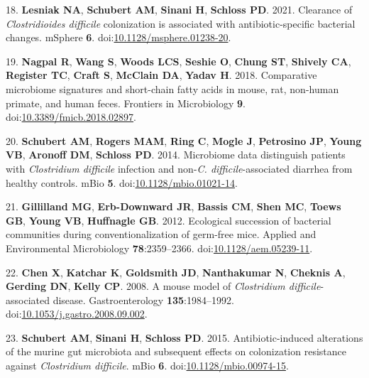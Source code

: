 \documentclass[
  12pt,
]{article}
\newenvironment{cslreferences}%
  {}%
  {\par}
\begin{document}
\begin{cslreferences}
\leavevmode\hypertarget{ref-Lesniak2021}{}%
18. \textbf{Lesniak NA}, \textbf{Schubert AM}, \textbf{Sinani H},
\textbf{Schloss PD}. 2021. Clearance of \emph{Clostridioides difficile}
colonization is associated with antibiotic-specific bacterial changes.
mSphere \textbf{6}.
doi:\href{https://doi.org/10.1128/msphere.01238-20}{10.1128/msphere.01238-20}.

\leavevmode\hypertarget{ref-Nagpal2018}{}%
19. \textbf{Nagpal R}, \textbf{Wang S}, \textbf{Woods LCS},
\textbf{Seshie O}, \textbf{Chung ST}, \textbf{Shively CA},
\textbf{Register TC}, \textbf{Craft S}, \textbf{McClain DA},
\textbf{Yadav H}. 2018. Comparative microbiome signatures and
short-chain fatty acids in mouse, rat, non-human primate, and human
feces. Frontiers in Microbiology \textbf{9}.
doi:\href{https://doi.org/10.3389/fmicb.2018.02897}{10.3389/fmicb.2018.02897}.

\leavevmode\hypertarget{ref-Schubert2014}{}%
20. \textbf{Schubert AM}, \textbf{Rogers MAM}, \textbf{Ring C},
\textbf{Mogle J}, \textbf{Petrosino JP}, \textbf{Young VB},
\textbf{Aronoff DM}, \textbf{Schloss PD}. 2014. Microbiome data
distinguish patients with \emph{Clostridium difficile} infection and
non-\emph{C. difficile}-associated diarrhea from healthy controls. mBio
\textbf{5}.
doi:\href{https://doi.org/10.1128/mbio.01021-14}{10.1128/mbio.01021-14}.

\leavevmode\hypertarget{ref-Gillilland2012}{}%
21. \textbf{Gillilland MG}, \textbf{Erb-Downward JR}, \textbf{Bassis
CM}, \textbf{Shen MC}, \textbf{Toews GB}, \textbf{Young VB},
\textbf{Huffnagle GB}. 2012. Ecological succession of bacterial
communities during conventionalization of germ-free mice. Applied and
Environmental Microbiology \textbf{78}:2359--2366.
doi:\href{https://doi.org/10.1128/aem.05239-11}{10.1128/aem.05239-11}.

\leavevmode\hypertarget{ref-Chen2008}{}%
22. \textbf{Chen X}, \textbf{Katchar K}, \textbf{Goldsmith JD},
\textbf{Nanthakumar N}, \textbf{Cheknis A}, \textbf{Gerding DN},
\textbf{Kelly CP}. 2008. A mouse model of \emph{Clostridium
difficile}-associated disease. Gastroenterology \textbf{135}:1984--1992.
doi:\href{https://doi.org/10.1053/j.gastro.2008.09.002}{10.1053/j.gastro.2008.09.002}.

\leavevmode\hypertarget{ref-Schubert2015}{}%
23. \textbf{Schubert AM}, \textbf{Sinani H}, \textbf{Schloss PD}. 2015.
Antibiotic-induced alterations of the murine gut microbiota and
subsequent effects on colonization resistance against \emph{Clostridium
difficile}. mBio \textbf{6}.
doi:\href{https://doi.org/10.1128/mbio.00974-15}{10.1128/mbio.00974-15}.


\end{cslreferences}
\end{document}
